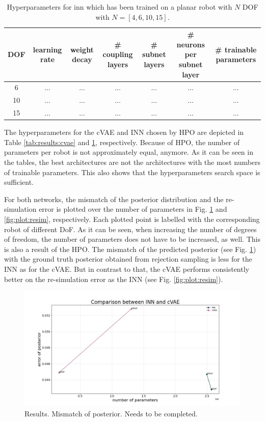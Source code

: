 \documentclass[conference]{IEEEtran}
\begin{document}
\begin{table}[h]
\centering
\begin{tabular}{|c|c|c|c|c|c|c|}
\hline
 DOF & learning rate & weight decay & \# coupling layers & \# subnet layers & \# neurons per subnet layer &  \# trainable parameters\\
 \hline
 6  & ... & ...& ... & ... & ... & ...\\
 10  & ... & ... & ... & ... & ... & ...\\
 15  & ... & ... & ... & ... & ... & ...\\
 \hline
\end{tabular}
\vspace{5pt}
\caption{\label{tab:results:inn}  Hyperparameters for inn which has been trained on a planar robot with $N$ DOF with $N=[4, 6, 10, 15]$.}
\end{table}

The hyperparameters for the cVAE and INN chosen by HPO are depicted in Table \ref{tab:results:cvae} and \ref{tab:results:inn}, respectively. Because of HPO, the number of parameters per robot is not approximately equal, anymore. As it can be seen in the tables, the best architectures are not the architectures with the most numbers of trainable parameters. This also shows that the hyperparameters search space is sufficient. 

For both networks, the mismatch of the posterior distribution and the re-simulation error is plotted over the number of parameters in Fig. \ref{fig:plot:posterior} and \ref{fig:plot:resim}, respectively. Each plotted point is labelled with the corresponding robot of different DoF. As it can be seen, when increasing the number of degrees of freedom, the number of parameters does not have to be increased, as well. This is also a result of the HPO. 
The mismatch of the predicted posterior (see Fig. \ref{fig:plot:posterior}) with the ground truth posterior obtained from rejection sampling is less for the INN as for the cVAE. But in contrast to that, the cVAE performs consistently better on the re-simulation error as the INN (see Fig. \ref{fig:plot:resim}).

\begin{figure}[!ht]
\centering
	\includegraphics[width=\linewidth]{figures/comparison_e_posterior_alternative.jpg}
    \caption{\label{fig:plot:posterior} Results. Mismatch of posterior. Needs to be completed.}
\end{figure}
\end{document}

